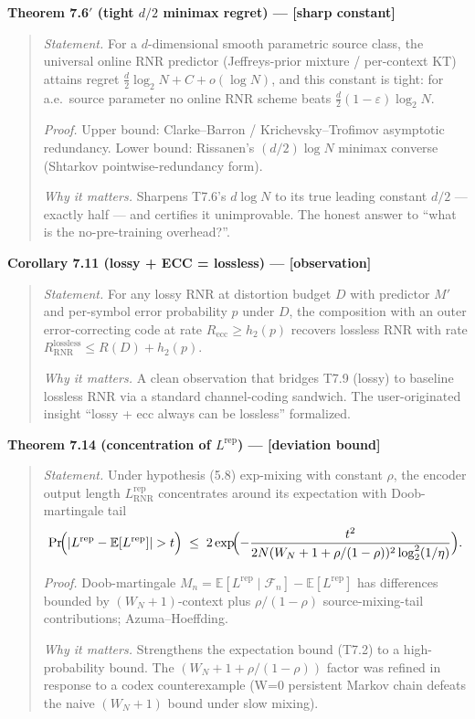 \documentclass[
]{article}
\begin{document}
\textbf{Theorem 7.6$'$ (tight $d/2$ minimax regret) --- {[}sharp
constant{]}}

\begin{quote}
\emph{Statement.} For a $d$-dimensional smooth parametric source
class, the universal online RNR predictor (Jeffreys-prior mixture /
per-context KT) attains regret $\tfrac{d}{2}\log_2 N + C + o(\log N)$,
and this constant is tight: for a.e.\ source parameter no online RNR
scheme beats $\tfrac{d}{2}(1-\varepsilon)\log_2 N$.

\emph{Proof.} Upper bound: Clarke--Barron / Krichevsky--Trofimov
asymptotic redundancy. Lower bound: Rissanen's $(d/2)\log N$ minimax
converse (Shtarkov pointwise-redundancy form).

\emph{Why it matters.} Sharpens T7.6's $d\log N$ to its true leading
constant $d/2$ --- exactly half --- and certifies it unimprovable.
The honest answer to ``what is the no-pre-training overhead?''.
\end{quote}

\textbf{Corollary 7.11 (lossy + ECC = lossless) --- {[}observation{]}}

\begin{quote}
\emph{Statement.} For any lossy RNR at distortion budget $D$ with
predictor $M'$ and per-symbol error probability $p$ under $D$, the
composition with an outer error-correcting code at rate
$R_{\mathrm{ecc}} \geq h_2(p)$ recovers lossless RNR with rate
$R^{\mathrm{lossless}}_{\mathrm{RNR}} \leq R(D) + h_2(p)$.

\emph{Why it matters.} A clean observation that bridges T7.9 (lossy)
to baseline lossless RNR via a standard channel-coding sandwich.
The user-originated insight ``lossy + ecc always can be lossless''
formalized.
\end{quote}

\textbf{Theorem 7.14 (concentration of $L^{\mathrm{rep}}$) ---
{[}deviation bound{]}}

\begin{quote}
\emph{Statement.} Under hypothesis (5.8) exp-mixing with constant
$\rho$, the encoder output length $L^{\mathrm{rep}}_{\mathrm{RNR}}$
concentrates around its expectation with Doob-martingale tail
\[
\Pr\!\Bigl(|L^{\mathrm{rep}} - \mathbb{E}[L^{\mathrm{rep}}]| > t\Bigr)
\;\leq\;
2 \exp\!\Bigl(-\frac{t^2}{2 N (W_N + 1 + \rho/(1-\rho))^2 \log_2^2(1/\eta)}\Bigr).
\]

\emph{Proof.} Doob-martingale $M_n = \mathbb{E}[L^{\mathrm{rep}} \mid
\mathcal{F}_n] - \mathbb{E}[L^{\mathrm{rep}}]$ has differences bounded
by $(W_N+1)$-context plus $\rho/(1-\rho)$ source-mixing-tail
contributions; Azuma--Hoeffding.

\emph{Why it matters.} Strengthens the expectation bound (T7.2) to a
high-probability bound. The $(W_N+1+\rho/(1-\rho))$ factor was refined
in response to a codex counterexample (W=0 persistent Markov chain
defeats the naive $(W_N+1)$ bound under slow mixing).
\end{quote}
\end{document}
